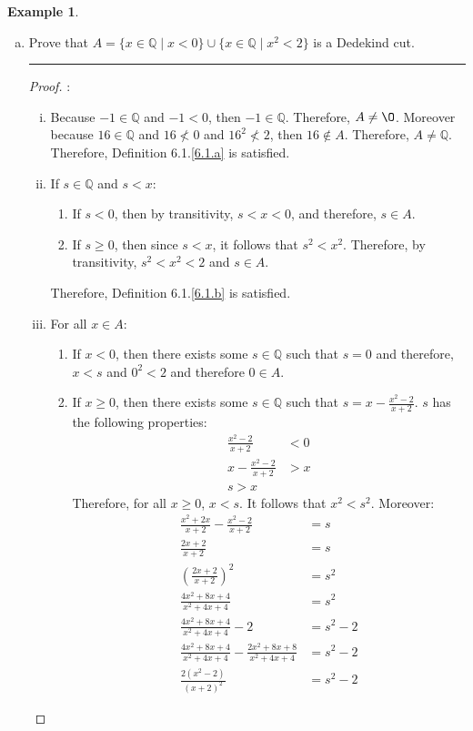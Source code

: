 \documentclass[openany, amssymb, psamsfonts]{amsart}
\newcommand{\bbQ}{\mathbb{Q}}
\renewcommand{\emptyset}{\O}
\theoremstyle{definition}
\newtheorem{exmp}{Example}[section]
\numberwithin{equation}{section}
\begin{document}
\begin{exmp}
\begin{enumerate}[(a)]
\item Prove that $A = \{x\in\bbQ\mid x<0\}\cup\{x\in\bbQ\mid x^2<2\}$ is a Dedekind cut.
\vspace{4pt}     \hrule   \vspace{4pt} \begin{proof} :\\
\begin{enumerate} [(i)]
\item Because $-1 \in \bbQ$ and $-1<0$, then $-1 \in \bbQ$. Therefore, $A \neq \emptyset$. Moreover because $16\in \bbQ$ and $16\not< 0$ and $16^2 \not < 2$, then $16\notin A$. Therefore, $A\neq \bbQ$. Therefore, Definition 6.1.\ref{6.1.a} is satisfied.
\item If $s\in \bbQ$ and $s<x$:
\begin{enumerate}[(1)]
\item If $s<0$, then by transitivity, $s<x<0$, and therefore, $s\in A$.
\item If $s \geq 0$, then since $s<x$, it follows that $s^2<x^2$. Therefore, by transitivity, $s^2 <x^2 <2$ and $s\in A$.
\end{enumerate}
Therefore, Definition 6.1.\ref{6.1.b} is satisfied.
\item For all $x\in A$:
\begin{enumerate}[(1)]
\item If $x<0$, then there exists some $s\in \bbQ$ such that $s=0$ and therefore, $x<s$ and $0^2 <2$ and therefore $0\in A$.
\item If $x\geq 0$, then there exists some $s\in \bbQ$ such that $s = x - \frac{x^2 -2}{x+2}$. $s$ has the following properties:
\begin{align*}
\frac{x^2 -2}{x+2} &<0\\
x-\frac{x^2 -2}{x+2} &>x\\
s>x
\end{align*}
Therefore, for all $x\geq 0$, $x<s$. It follows that $x^2 <s^2$. Moreover:
\begin{align*}
\frac{x^2 +2x}{x+2}-\frac{x^2 -2}{x+2} &=s\\
\frac{2x+2}{x+2} &=s\\
(\frac{2x+2}{x+2})^2 &=s^2\\
\frac{4x^2+8x+4}{x^2+4x+4} &= s^2\\
\frac{4x^2+8x+4}{x^2+4x+4} -2 &= s^2 -2 \\
\frac{4x^2+8x+4}{x^2+4x+4} -\frac{2x^2+8x+8}{x^2+4x+4} &= s^2 -2 \\
\frac{2(x^2-2)}{(x+2)^2} &= s^2 -2
\end{align*}

\end{enumerate}
\end{enumerate}
\end{proof}
\end{enumerate}
\end{exmp}
\end{document}
